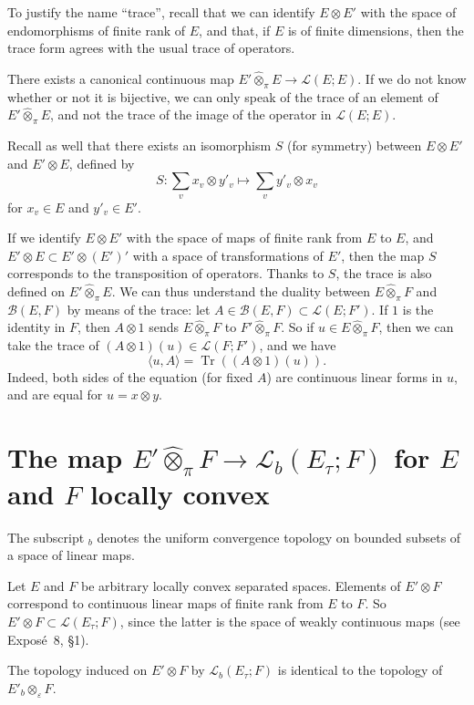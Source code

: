 \documentclass{article}
\theoremstyle{plain}
\newenvironment{proposition}[1]
    {\renewcommand\theinnercustomproposition{#1}\innercustomproposition}
    {\endinnercustomproposition}
\theoremstyle{definition}
\newcommand{\BB}{\mathcal{B}}
\newcommand{\LL}{\mathcal{L}}
\newcommand{\injotimes}{{\otimes}_\varepsilon}
\newcommand{\cprojotimes}{\widehat{\otimes}_\pi}
\newcommand{\tr}{\operatorname{Tr}}
\newcommand{\oldpage}[1]{\marginpar{\footnotesize$\Big\vert$ \textit{p.~#1}}}
\begin{document}
To justify the name ``trace'', recall that we can identify $E\otimes E'$ with the space of endomorphisms of finite rank of $E$, and that, if $E$ is of finite dimensions, then the trace form agrees with the usual trace of operators.

There exists a canonical continuous map $E'\cprojotimes E\to\LL(E;E)$.
If we do not know whether or not it is bijective, we can only speak of the trace of an element of $E'\cprojotimes E$, and not the trace of the image of the operator in $\LL(E;E)$.

Recall as well that there exists an isomorphism $S$ (for symmetry) between $E\otimes E'$ and $E'\otimes E$, defined by
\[
  S\colon \sum_v x_v\otimes y'_v \mapsto \sum_v y'_v\otimes x_v
\]
for $x_v\in E$ and $y'_v\in E'$.

If we identify $E\otimes E'$ with the space of maps of finite rank from $E$ to $E$, and $E'\otimes E\subset E'\otimes(E')'$ with a space of transformations of $E'$,
\oldpage{2}
then the map $S$ corresponds to the transposition of operators.
Thanks to $S$, the trace is also defined on $E'\cprojotimes E$.
We can thus understand the duality between $E\cprojotimes F$ and $\BB(E,F)$ by means of the trace: let $A\in\BB(E,F)\subset\LL(E;F')$.
If $1$ is the identity in $F$, then $A\otimes1$ sends $E\cprojotimes F$ to $F'\cprojotimes F$.
So if $u\in E\cprojotimes F$, then we can take the trace of $(A\otimes1)(u)\in\LL(F;F')$, and we have
\[
\label{equation1}
  \langle u,A \rangle = \tr((A\otimes1)(u)).
  \tag{1}
\]
Indeed, both sides of the equation (for fixed $A$) are continuous linear forms in $u$, and are equal for $u=x\otimes y$.


\section{The map \texorpdfstring{$E'\cprojotimes F\to\LL_b(E_\tau;F)$}{E'(x)F->L_b(E_t;F)} for \texorpdfstring{$E$}{E} and \texorpdfstring{$F$}{F} locally convex}
\label{section2}

The subscript ${}_b$ denotes the uniform convergence topology on bounded subsets of a space of linear maps.

Let $E$ and $F$ be arbitrary locally convex separated spaces.
Elements of $E'\otimes F$ correspond to continuous linear maps of finite rank from $E$ to $F$.
So $E'\otimes F\subset\LL(E_\tau;F)$, since the latter is the space of weakly continuous maps (see Expos\'{e}~8, §1).

\begin{proposition}{1}
\label{proposition1}
  The topology induced on $E'\otimes F$ by $\LL_b(E_\tau;F)$ is identical to the topology of $E'_b\injotimes F$.
\end{proposition}
\end{document}
